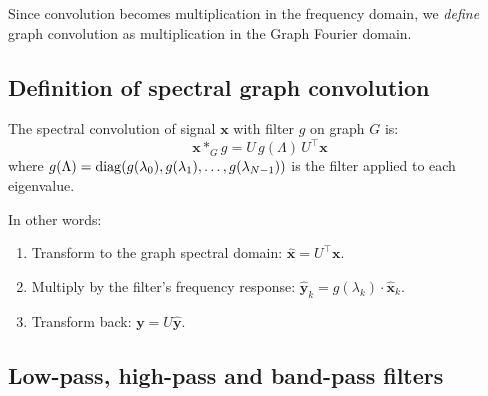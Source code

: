 \begin{notechapter}
\begin{keyidea}
Since convolution becomes multiplication
in the frequency domain, we \emph{define} graph convolution as
multiplication in the Graph Fourier domain.
\end{keyidea}

\subsection{Definition of spectral graph convolution}

\begin{definition}
The spectral convolution of signal $\mathbf{x}$ with filter $g$ on
graph $G$ is:
\begin{equation}
\mathbf{x} *_G g = U \, g(\Lambda) \, U^\top \mathbf{x}
\end{equation}
where $g(\Lambda) = \operatorname{diag}(g(\lambda_0), g(\lambda_1), \ldots,
g(\lambda_{N-1}))$ is the filter applied to each eigenvalue.
\end{definition}

In other words:
\begin{enumerate}
\item Transform to the graph spectral domain:
      $\hat{\mathbf{x}} = U^\top \mathbf{x}$.
\item Multiply by the filter's frequency response:
      $\hat{\mathbf{y}}_k = g(\lambda_k) \cdot \hat{\mathbf{x}}_k$.
\item Transform back: $\mathbf{y} = U \hat{\mathbf{y}}$.
\end{enumerate}

\subsection{Low-pass, high-pass and band-pass filters}


\end{notechapter}
